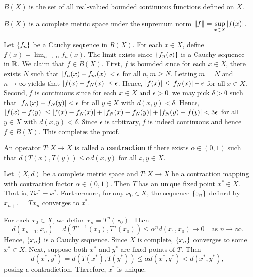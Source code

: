 \documentclass[12pt]{article}
\begin{document}
\begin{definition}
    $B(X)$ is the set of all real-valued bounded continuous functions 
    defined on $X$.
\end{definition}

\begin{proposition}
    $B(X)$ is a complete metric space under the supremum norm
    $\displaystyle \left\lVert {f} \right\rVert = \sup_{x \in X} \left\lvert {f(x)} \right\rvert$.
\end{proposition}
\begin{pf}
    Let $\left\{ {f_n} \right\}$ be a Cauchy sequence in $B(X)$. For each $x \in 
    X$, define $f(x) = \lim_{n\to\infty} f_n(x)$. The limit exists 
    since $\left\{ {f_n(x)} \right\}$ is a Cauchy sequence in $\mathbb{R}$. We claim that
    $f\in B(X)$. First, $f$ is bounded since for each $x \in X$, 
    there exists $N$ such that $\left\lvert {f_n(x) - f_m(x)} \right\rvert < \epsilon$ 
    for all $n, m \geq N$. Letting $m = N$ and $n\to\infty$ yields 
    that $\left\lvert {f(x) - f_N(x)} \right\rvert\leq \epsilon$. Hence, $\left\lvert {f(x)} \right\rvert \leq 
    \left\lvert {f_N(x)} \right\rvert + \epsilon$ for all $x \in X$. Second, $f$ is 
    continuous since for each $x \in X$ and $\epsilon > 0$, we 
    may pick $\delta > 0$ such that $\left\lvert {f_N(x) - f_N(y)} \right\rvert < 
    \epsilon$ for all $y \in X$ with $d(x, y) < \delta$. Hence, 
    $\left\lvert {f(x) - f(y)} \right\rvert \leq \left\lvert {f(x) - f_N(x)} \right\rvert + \left\lvert {f_N(x) - 
    f_N(y)} \right\rvert + \left\lvert {f_N(y) - f(y)} \right\rvert < 3\epsilon$ for all $y \in X$ 
    with $d(x, y) < \delta$. Since $\epsilon$ is arbitrary, $f$ 
    is indeed continuous and hence $f\in B(X)$. This completes 
    the proof.
\end{pf}

\begin{definition}
    An operator $T: X \to X$ is called a \textbf{contraction} 
    if there exists $\alpha \in (0, 1)$ such that $d(T(x), T(y)) \leq 
    \alpha d(x, y)$ for all $x, y \in X$.
\end{definition}

\begin{theorem}
    Let $(X, d)$ be a complete metric space and $T: X \to X$ be a 
    contraction mapping with contraction factor $\alpha \in (0, 1)$. 
    Then $T$ has an unique fixed point $x^* \in X$. That is, $Tx^* 
    = x^*$. Furthermore, for any $x_0\in X$, the sequence $\left\{ {x_n} \right\}$ 
    defined by $x_{n+1} = Tx_n$ converges to $x^*$.
\end{theorem}
\begin{pf}
    For each $x_0 \in X$, we define $x_n = T^n(x_0)$. Then 
    \begin{equation}
        d(x_{n+1}, x_n) = d(T^{n+1}(x_0), T^n(x_0)) \leq \alpha^n 
        d(x_1, x_0)\to 0 \quad \text{as } n\to\infty.
    \end{equation}
    Hence, $\left\{ {x_n} \right\}$ is a Cauchy sequence. Since $X$ is complete, 
    $\left\{ {x_n} \right\}$ converges to some $x^* \in X$. Next, suppose both 
    $x^*$ and $y^*$ are fixed points of $T$. Then 
    \begin{equation}
        d(x^*, y^*) = d(T(x^*), T(y^*)) \leq \alpha d(x^*, y^*) 
        < d(x^*, y^*),
    \end{equation}
    posing a contradiction. Therefore, $x^*$ is unique.  
\end{pf}
\end{document}
